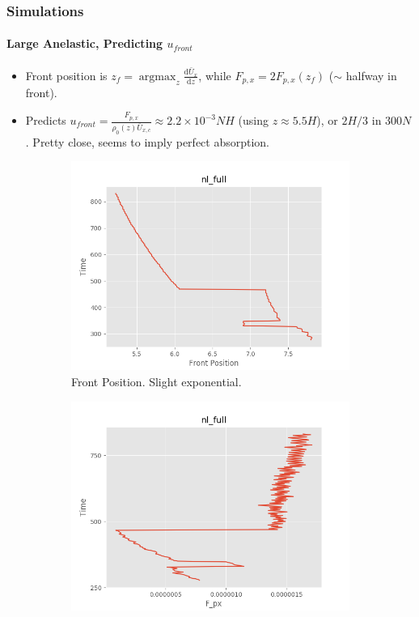 \documentclass[dvipsnames, 10pt]{beamer}
\newcommand*{\scinot}[2]{#1\times10^{#2}}
\newcommand*{\rd}[2]{\frac{\mathrm{d}#1}{\mathrm{d}#2}}
\DeclareMathOperator*{\argmax}{argmax}
\begin{document}
\begin{frame}
    \frametitle{Simulations}
    \framesubtitle{Large Anelastic, Predicting $u_{front}$}

    \begin{itemize}
        \item Front position is $z_f = \argmax_z \rd{\bar{U}_x}{z}$, while
            $F_{p, x} = 2F_{p, x}(z_f)$ ($\sim$ halfway in front).

        \item Predicts $u_{front} = \frac{F_{p, x}}{\rho_0(z) \bar{U}_{x, c}}
            \approx \scinot{2.2}{-3}NH$ (using $z \approx 5.5H$), or $2H/3$ in
            $300N$. Pretty close, seems to imply perfect absorption.
    \end{itemize}
    \begin{figure}[t]
        \centering
        \hspace*{-19mm}%
        \begin{subfigure}{0.53\textwidth}
            \centering
            \includegraphics[width=\textwidth]{front_nl_full.png}
            \caption{Front Position. Slight exponential.}
        \end{subfigure}
        \begin{subfigure}{0.53\textwidth}
            \centering
            \includegraphics[width=\textwidth]{fluxes_nl_full.png}

\end{subfigure}
\end{figure}
\end{frame}
\end{document}
